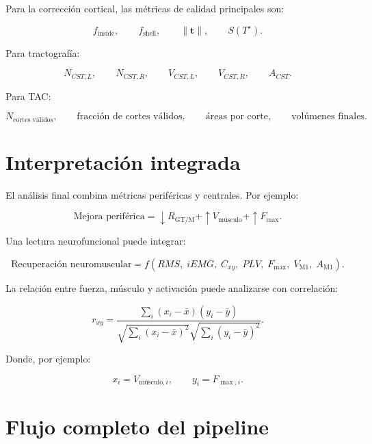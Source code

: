 \documentclass[12pt,a4paper]{article}
\begin{document}
Para la corrección cortical, las métricas de calidad principales son:

\[
f_{\text{inside}},
\qquad
f_{\text{shell}},
\qquad
\|\mathbf{t}\|,
\qquad
S(T^\star).
\]

Para tractografía:

\[
N_{CST,L},\qquad N_{CST,R},\qquad V_{CST,L},\qquad V_{CST,R},\qquad A_{CST}.
\]

Para TAC:

\[
N_{\text{cortes válidos}},
\qquad
\text{fracción de cortes válidos},
\qquad
\text{áreas por corte},
\qquad
\text{volúmenes finales}.
\]

\section{Interpretación integrada}

El análisis final combina métricas periféricas y centrales. Por ejemplo:

\[
\text{Mejora periférica}
=
\downarrow R_{\text{GT/M}}
+
\uparrow V_{\text{músculo}}
+
\uparrow F_{\max}.
\]

Una lectura neurofuncional puede integrar:

\[
\text{Recuperación neuromuscular}
=
f(
RMS,\; iEMG,\; C_{xy},\; PLV,\; F_{\max},\; V_{\text{M1}},\; A_{\text{M1}}
).
\]

La relación entre fuerza, músculo y activación puede analizarse con correlación:

\[
r_{xy}
=
\frac{
\sum_i (x_i-\bar{x})(y_i-\bar{y})
}
{
\sqrt{\sum_i(x_i-\bar{x})^2}
\sqrt{\sum_i(y_i-\bar{y})^2}
}.
\]

Donde, por ejemplo:

\[
x_i=V_{\text{músculo},i},
\qquad
y_i=F_{\max,i}.
\]

\section{Flujo completo del pipeline}
\end{document}
